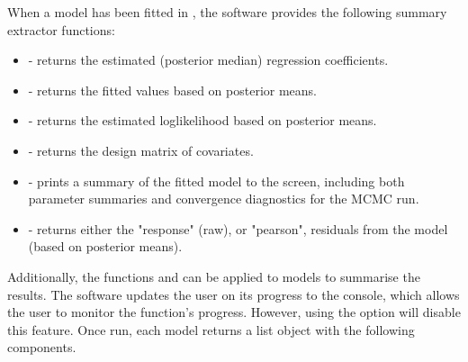 \documentclass[article, nojss]{jss}
\begin{document}
When a model has been fitted in , the software provides the following summary extractor functions: 


\begin{itemize}
\item {} - returns the estimated (posterior median) regression coefficients. 
\item {} - returns the fitted values based on posterior means.
\item {} - returns the estimated loglikelihood based on posterior means.
\item {} - returns the design matrix of covariates.
\item {} - prints a summary of the fitted model to the screen, including both parameter summaries and convergence diagnostics for the MCMC run.
\item {} - returns either the "response" (raw), or "pearson", residuals from the model (based on posterior means).
\end{itemize}

Additionally, the  functions  and  can  be applied to  models to summarise the results. The software updates the user on its progress to the  console, which allows the user to monitor the function's progress. However, using the  option will disable this feature. Once run, each model returns a list object with the following components. 
\end{document}
